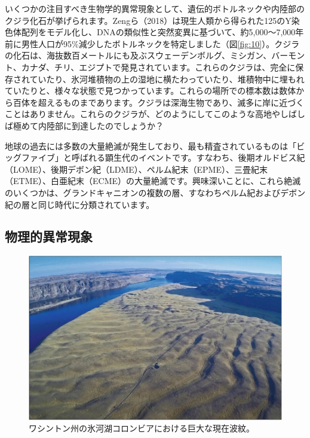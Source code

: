 \documentclass[10pt,twocolumn,letterpaper]{article}
\begin{document}
いくつかの注目すべき生物学的異常現象として、遺伝的ボトルネックや内陸部のクジラ化石が挙げられます。Zengら（2018）は現生人類から得られた125のY染色体配列をモデル化し、DNAの類似性と突然変異に基づいて、約5,000～7,000年前に男性人口が95\%減少したボトルネックを特定しました（図\ref{fig:10}）\cite{62}。クジラの化石は、海抜数百メートルにも及ぶスウェーデンボルグ、ミシガン、バーモント、カナダ、チリ、エジプトで発見されています\cite{63,64,65,66}。これらのクジラは、完全に保存されていたり、氷河堆積物の上の湿地に横たわっていたり、堆積物中に埋もれていたりと、様々な状態で見つかっています。これらの場所での標本数は数体から百体を超えるものまであります。クジラは深海生物であり、滅多に岸に近づくことはありません。これらのクジラが、どのようにしてこのような高地やしばしば極めて内陸部に到達したのでしょうか？

地球の過去には多数の大量絶滅が発生しており、最も精査されているものは「ビッグファイブ」と呼ばれる顕生代のイベントです。すなわち、後期オルドビス紀（LOME）、後期デボン紀（LDME）、ペルム紀末（EPME）、三畳紀末（ETME）、白亜紀末（ECME）の大量絶滅です\cite{88,89}。興味深いことに、これら絶滅のいくつかは、グランドキャニオンの複数の層、すなわちペルム紀およびデボン紀の層と同じ時代に分類されています。

\subsection{物理的異常現象}

\begin{figure}[b]
\begin{center}
   \includegraphics[width=1\linewidth]{columbia.jpg}
\end{center}
   \caption{ワシントン州の氷河湖コロンビアにおける巨大な現在波紋\cite{80}。}
\label{fig:11}
\label{fig:onecol}
\end{figure}
\end{document}
